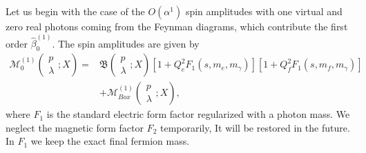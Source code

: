 Let us begin with the case of the $O(\alpha^1)$ spin amplitudes with one virtual and zero real photons coming from the Feynman diagrams, which contribute the first order $\hat{\beta}^{(1)}_0$. The spin amplitudes are given by
\begin{align}
\mathcal{M}_0^{(1)}\left(\begin{array}{c}
p\\\lambda
\end{array};X\right)=&\mathfrak{B}\left(\begin{array}{c}
p\\\lambda
\end{array};X\right)[1+Q^2_eF_1(s,m_e,m_\gamma)][1+Q^2_fF_1(s,m_f,m_\gamma)]\nonumber\\
&+\mathcal{M}^{(1)}_{Box}\left(\begin{array}{c}
p\\\lambda
\end{array};X\right),
\end{align}
where $F_1$ is the standard electric form factor regularized with a photon mass. We neglect the magnetic form factor $F_2$ temporarily, It will be restored in the future. In $F_1$ we keep the exact final fermion mass. 

